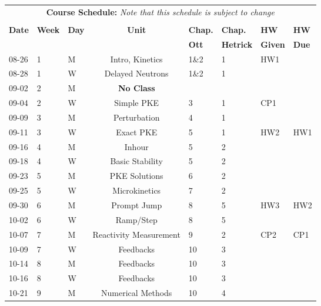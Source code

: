 \documentclass[11pt]{article}
\begin{document}
\pagebreak
\FloatBarrier
\renewcommand{\arraystretch}{1}
\begin{table}[h]
\begin{center}
\begin{tabular}{lllcllll}
\multicolumn{8}{c}{\textbf{Course Schedule:}\textit{ Note that this schedule is subject to change}}\\
&&&&&&&\\
\textbf{Date} & \textbf{Week} & \textbf{Day} & \textbf{Unit} & \textbf{Chap.} & \textbf{Chap.} & \textbf{HW} & \textbf{HW}\\
              &  &  & & \textbf{Ott}& \textbf{Hetrick} & \textbf{Given} & \textbf{Due}\\
\hline
\hline
08-26 & 1 & M  & Intro, Kinetics                & 1\&2 & 1 & HW1  & \\
08-28 & 1 & W & Delayed Neutrons                & 1\&2 & 1 &      & \\
09-02 & 2 & M  & \textbf{No Class}              &    &   &      & \\
09-04 & 2 & W & Simple PKE                      & 3  & 1 & CP1  & \\
09-09 & 3 & M  & Perturbation                   & 4  & 1 &      & \\
09-11 & 3 & W & Exact PKE                       & 5  & 1 & HW2  & HW1\\
09-16 & 4 & M  & Inhour                         & 5  & 2 &      & \\
09-18 & 4 & W &  Basic Stability                & 5  & 2 &      & \\
09-23 & 5 & M  & PKE Solutions                  & 6  & 2 &      & \\
09-25 & 5 & W & Microkinetics                   & 7  & 2   &      & \\
09-30 & 6 & M  & Prompt Jump                    & 8  & 5 & HW3  & HW2\\
10-02 & 6 & W & Ramp/Step                       & 8  & 5 &      & \\
10-07 & 7 & M  & Reactivity Measurement         & 9  & 2 & CP2  & CP1\\
10-09 & 7 & W & Feedbacks                       & 10 & 3 &      & \\
10-14 & 8 & M  & Feedbacks                      & 10 & 3 &      & \\
10-16 & 8 & W & Feedbacks                       & 10 & 3 &      & \\
10-21 & 9 & M  & Numerical Methods              & 10 & 4 &      & \\

\end{tabular}
\end{center}
\end{table}
\end{document}

